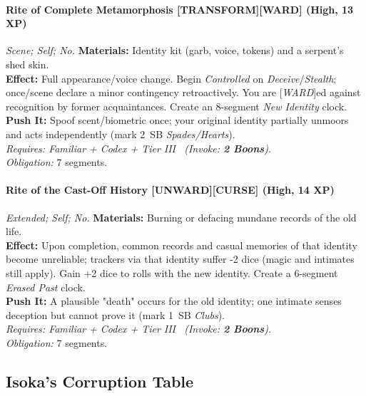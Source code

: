 \paragraph{Rite of Complete Metamorphosis \textnormal{[TRANSFORM][WARD]} (High, 13 XP)} \emph{Scene; Self; No.}
\textbf{Materials:} Identity kit (garb, voice, tokens) and a serpent's shed skin.\\
\textbf{Effect:} Full appearance/voice change. Begin \emph{Controlled} on \emph{Deceive}/\emph{Stealth}; once/scene declare a minor contingency retroactively. You are [\emph{WARD}]ed against recognition by former acquaintances. Create an 8-segment \emph{New Identity} clock.\\
\textbf{Push It:} Spoof scent/biometric once; your original identity partially unmoors and acts independently (mark 2~SB \emph{Spades/Hearts}).\\
\emph{Requires: Familiar + Codex + Tier III \ (\textit{Invoke:} \textbf{2 Boons}).}\\
\emph{Obligation:} 7 segments.

\paragraph{Rite of the Cast-Off History \textnormal{[UNWARD][CURSE]} (High, 14 XP)} \emph{Extended; Self; No.}
\textbf{Materials:} Burning or defacing mundane records of the old life.\\
\textbf{Effect:} Upon completion, common records and casual memories of that identity become unreliable; trackers via that identity suffer -2 dice (magic and intimates still apply). Gain +2 dice to rolls with the new identity. Create a 6-segment \emph{Erased Past} clock.\\
\textbf{Push It:} A plausible "death" occurs for the old identity; one intimate senses deception but cannot prove it (mark 1~SB \emph{Clubs}).\\
\emph{Requires: Familiar + Codex + Tier III \ (\textit{Invoke:} \textbf{2 Boons}).}\\
\emph{Obligation:} 7 segments.

\subsection*{Isoka's Corruption Table}
\label{sec:isoka-corruption}

